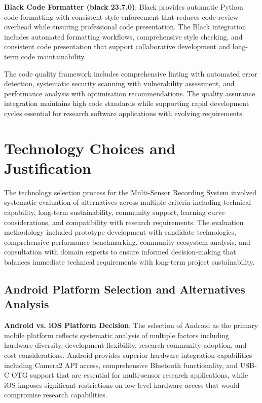 \documentclass[11pt,a4paper]{report}
\begin{document}
\noindent \textbf{Black Code Formatter (black 23.7.0)}: Black provides automatic Python code formatting with consistent style enforcement that reduces code review overhead while ensuring professional code presentation. The Black integration includes automated formatting workflows, comprehensive style checking, and consistent code presentation that support collaborative development and long-term code maintainability.

The code quality framework includes comprehensive linting with automated error detection, systematic security scanning with vulnerability assessment, and performance analysis with optimisation recommendations. The quality assurance integration maintains high code standards while supporting rapid development cycles essential for research software applications with evolving requirements.

\section{Technology Choices and Justification}

The technology selection process for the Multi-Sensor Recording System involved systematic evaluation of alternatives across multiple criteria including technical capability, long-term sustainability, community support, learning curve considerations, and compatibility with research requirements. The evaluation methodology included prototype development with candidate technologies, comprehensive performance benchmarking, community ecosystem analysis, and consultation with domain experts to ensure informed decision-making that balances immediate technical requirements with long-term project sustainability.

\subsection{Android Platform Selection and Alternatives Analysis}

\noindent \textbf{Android vs. iOS Platform Decision}: The selection of Android as the primary mobile platform reflects systematic analysis of multiple factors including hardware diversity, development flexibility, research community adoption, and cost considerations. Android provides superior hardware integration capabilities including Camera2 API access, comprehensive Bluetooth functionality, and USB-C OTG support that are essential for multi-sensor research applications, while iOS imposes significant restrictions on low-level hardware access that would compromise research capabilities.
\end{document}
